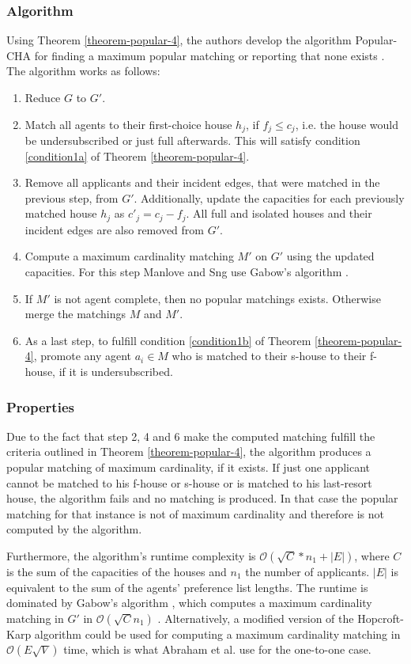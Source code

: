 \subsubsection{Algorithm}
Using Theorem \ref{theorem-popular-4}, the authors develop the algorithm Popular-CHA for finding a maximum popular matching or reporting that none exists \cite{ManlovePopularMatchings}. The algorithm works as follows:
\begin{enumerate}
    \item Reduce $G$ to $G'$.
    \item Match all agents to their first-choice house $h_j$, if $f_j \leq c_j$, i.e. the house would be undersubscribed or just full afterwards. This will satisfy condition \ref{condition1a} of Theorem \ref{theorem-popular-4}.
    \item Remove all applicants and their incident edges, that were matched in the previous step, from $G'$. Additionally, update the capacities for each previously matched house $h_j$ as $c'_j = c_j - f_j$. All full and isolated houses and their incident edges are also removed from $G'$.
    \item Compute a maximum cardinality matching $M'$ on $G'$ using the updated capacities. For this step Manlove and Sng use Gabow's algorithm \cite{Gabow1983}.
    \item If $M'$ is not agent complete, then no popular matchings exists. Otherwise merge the matchings $M$ and $M'$.
    \item As a last step, to fulfill condition \ref{condition1b} of Theorem \ref{theorem-popular-4}, promote any agent $a_i \in M$ who is matched to their s-house to their f-house, if it is undersubscribed. 
\end{enumerate}


\subsubsection{Properties}
Due to the fact that step 2, 4 and 6 make the computed matching fulfill the criteria outlined in Theorem \ref{theorem-popular-4}, the algorithm produces a popular matching of maximum cardinality, if it exists. If just one applicant cannot be matched to his f-house or s-house or is matched to his last-resort house, the algorithm fails and no matching is produced. In that case the popular matching for that instance is not of maximum cardinality and therefore is not computed by the algorithm. 

Furthermore, the algorithm's runtime complexity is $\mathcal{O}(\sqrt{C} * n_1 + |E|)$, where $C$ is the sum of the capacities of the houses and $n_1$ the number of applicants. $|E|$ is equivalent to the sum of the agents' preference list lengths. The runtime is dominated by Gabow's algorithm \cite{Gabow1983}, which computes a maximum cardinality matching in $G'$ in $\mathcal{O}(\sqrt{C}n_1)$ \cite{ManlovePopularMatchings}. Alternatively, a modified version of the Hopcroft-Karp algorithm could be used for computing a maximum cardinality matching in $\mathcal{O}(E\sqrt{V})$\cite{Hopcroft} time, which is what Abraham et al. use for the one-to-one case.


